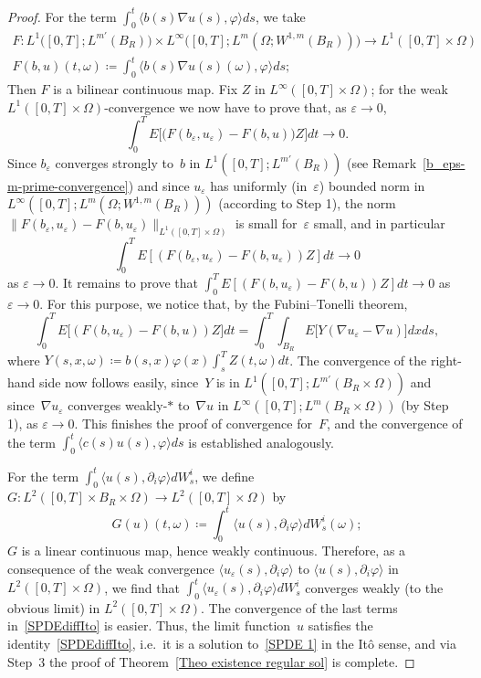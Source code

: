 \documentclass[a4paper,10pt]{article}
\newcommand\1{\mathbbm{1}}
\newcommand{\lan}{\langle}
\newcommand{\ran}{\rangle}
\newcommand{\eps}{\varepsilon}
\numberwithin{equation}{section}
\begin{document}
\begin{proof}
For the term $\int^t_0 \lan b(s)\nabla u(s), \varphi \ran ds$, we take 
\begin{gather*}
F \colon L^1\big([0,T];L^{m'}(B_R) \big) \times L^\infty \big([0,T]; L^m(\Omega;W^{1,m}(B_R))\big) \rightarrow L^1([0,T]\times\Omega) \\
F(b,u)(t,\omega) \coloneqq  \int^t_0 \lan b(s)\nabla u(s)(\omega), \varphi \ran ds;
\end{gather*}
Then $F$ is a bilinear continuous map. Fix $Z$ in $L^\infty([0,T]\times\Omega)$; for the weak $L^1([0,T]\times\Omega)$-convergence we now have to prove that, as $\eps\rightarrow0$,
\begin{equation*}
\int^T_0E \big[ \big(F(b_\eps,u_\eps)-F(b,u) \big) Z \big]dt\rightarrow 0 .
\end{equation*}
Since $b_\eps$ converges strongly to~$b$ in $L^1([0,T];L^{m'}(B_R))$ (see Remark~\ref{b_eps-m-prime-convergence}) and since $u_\eps$ has uniformly (in~$\eps$) bounded norm in $L^\infty([0,T];L^m(\Omega;W^{1,m}(B_R)))$ (according to Step 1), the norm $\|F(b_\eps,u_\eps)-F(b,u_\eps)\|_{L^1([0,T]\times\Omega)}$ is small for~$\eps$ small, and in particular 
\begin{equation*}
\int^T_0E[(F(b_\eps,u_\eps)-F(b,u_\eps))Z]dt \rightarrow 0
\end{equation*}
as $\eps \rightarrow 0$. It remains to prove that $\int^T_0E[(F(b,u_\eps)-F(b,u))Z]dt \to 0$ as $\eps \to 0$. For this purpose, we notice that, by the Fubini--Tonelli theorem,
\begin{equation*}
\int^T_0 E \big[ (F(b,u_\eps)-F(b,u))Z \big] dt=\int^T_0\int_{B_R}E \big[Y (\nabla u_\eps - \nabla u) \big]dxds ,
\end{equation*}
where $Y(s,x,\omega) \coloneqq b(s,x)\varphi(x)\int^T_s Z(t,\omega)dt$. The convergence of the right-hand side now follows easily, since~$Y$ is in $L^1([0,T];L^{m'}(B_R\times\Omega))$ and since~$\nabla u_\eps$ converges weakly-$*$ to~$\nabla u$ in $L^\infty([0,T];L^m(B_R \times \Omega))$ (by Step 1), as $\eps \rightarrow 0$. This finishes the proof of convergence for~$F$, and the convergence of the term $\int^t_0 \lan c(s) u(s), \varphi \ran ds$ is established analogously.

For the term $\int^t_0\lan u(s),\partial_i\varphi\ran dW^i_s$, we define $G \colon L^2([0,T]\times B_R\times\Omega)\rightarrow L^2([0,T]\times\Omega)$ by
\begin{equation*}
G(u)(t,\omega)\coloneqq \int^t_0\lan u(s),\partial_i\varphi\ran dW^i_s(\omega);
\end{equation*}
$G$ is a linear continuous map, hence weakly continuous. Therefore, as a consequence of the weak convergence $\lan u_\eps (s),\partial_i\varphi\ran$ to $\lan u (s),\partial_i\varphi\ran$ in $L^2([0,T]\times\Omega)$, we find that $\int^t_0\lan u_\eps (s),\partial_i\varphi\ran dW^i_s$ converges weakly (to the obvious limit) in $L^2([0,T]\times\Omega)$. The convergence of the last terms in~\eqref{SPDEdiffIto} is easier. Thus, the limit function~$u$ satisfies the identity~\eqref{SPDEdiffIto}, i.e.~it is a solution to~\eqref{SPDE 1} in the It\^o sense, and via Step~3 the proof of Theorem~\ref{Theo existence regular sol} is complete.
\end{proof}
\end{document}
